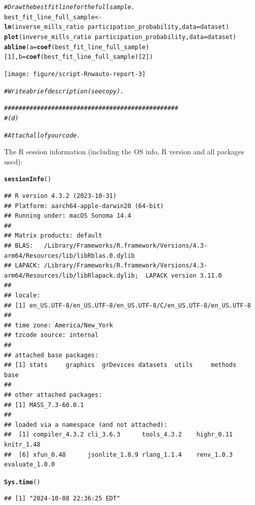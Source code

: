 \documentclass{article}\usepackage[]{graphicx}\usepackage[]{xcolor}
\makeatletter
\newcommand{\hlnum}[1]{\textcolor[rgb]{0.686,0.059,0.569}{#1}}%
\newcommand{\hlcom}[1]{\textcolor[rgb]{0.678,0.584,0.686}{\textit{#1}}}%
\newcommand{\hlopt}[1]{\textcolor[rgb]{0,0,0}{#1}}%
\newcommand{\hldef}[1]{\textcolor[rgb]{0.345,0.345,0.345}{#1}}%
\newcommand{\hlkwb}[1]{\textcolor[rgb]{0.69,0.353,0.396}{#1}}%
\newcommand{\hlkwc}[1]{\textcolor[rgb]{0.333,0.667,0.333}{#1}}%
\newcommand{\hlkwd}[1]{\textcolor[rgb]{0.737,0.353,0.396}{\textbf{#1}}}%
\newenvironment{kframe}{%
 \def\at@end@of@kframe{}%
 \ifinner\ifhmode%
  \def\at@end@of@kframe{\end{minipage}}%
  \begin{minipage}{\columnwidth}%
 \fi\fi%
 \def\FrameCommand##1{\hskip\@totalleftmargin \hskip-\fboxsep
 \colorbox{shadecolor}{##1}\hskip-\fboxsep
     \hskip-\linewidth \hskip-\@totalleftmargin \hskip\columnwidth}%
 \MakeFramed {\advance\hsize-\width
   \@totalleftmargin\z@ \linewidth\hsize
   \@setminipage}}%
 {\par\unskip\endMakeFramed%
 \at@end@of@kframe}
\newenvironment{knitrout}{}{} %
\makeatother
\begin{document}
\begin{knitrout}
{}


\begin{kframe}\begin{alltt}
\hlcom{# Draw the best fit line for the full sample.}
\hldef{best_fit_line_full_sample} \hlkwb{<-} \hlkwd{lm}\hldef{(inverse_mills_ratio}\hlopt{~}\hldef{participation_probability,} \hlkwc{data}\hldef{=dataset)}
\hlkwd{plot}\hldef{(inverse_mills_ratio}\hlopt{~}\hldef{participation_probability,} \hlkwc{data}\hldef{=dataset)}
\hlkwd{abline}\hldef{(}\hlkwc{a}\hldef{=}\hlkwd{coef}\hldef{(best_fit_line_full_sample)[}\hlnum{1}\hldef{],} \hlkwc{b}\hldef{=}\hlkwd{coef}\hldef{(best_fit_line_full_sample)[}\hlnum{2}\hldef{])}
\end{alltt}
\end{kframe}

{\centering \texttt{[image: figure/script-Rnwauto-report-3]} 

}


\begin{kframe}\begin{alltt}
\hlcom{#Write a brief description (see copy).}

\hlcom{################################################}
\hlcom{# (d)}

\hlcom{# Attach all of your code.}
\end{alltt}
\end{kframe}
\end{knitrout}

The R session information (including the OS info, R version and all
packages used):

\begin{knitrout}
\color{fgcolor}\begin{kframe}
\begin{alltt}
\hlkwd{sessionInfo}\hldef{()}
\end{alltt}
\begin{verbatim}
## R version 4.3.2 (2023-10-31)
## Platform: aarch64-apple-darwin20 (64-bit)
## Running under: macOS Sonoma 14.4
## 
## Matrix products: default
## BLAS:   /Library/Frameworks/R.framework/Versions/4.3-arm64/Resources/lib/libRblas.0.dylib 
## LAPACK: /Library/Frameworks/R.framework/Versions/4.3-arm64/Resources/lib/libRlapack.dylib;  LAPACK version 3.11.0
## 
## locale:
## [1] en_US.UTF-8/en_US.UTF-8/en_US.UTF-8/C/en_US.UTF-8/en_US.UTF-8
## 
## time zone: America/New_York
## tzcode source: internal
## 
## attached base packages:
## [1] stats     graphics  grDevices datasets  utils     methods   base     
## 
## other attached packages:
## [1] MASS_7.3-60.0.1
## 
## loaded via a namespace (and not attached):
##  [1] compiler_4.3.2 cli_3.6.3      tools_4.3.2    highr_0.11     knitr_1.48    
##  [6] xfun_0.48      jsonlite_1.8.9 rlang_1.1.4    renv_1.0.3     evaluate_1.0.0
\end{verbatim}
\begin{alltt}
\hlkwd{Sys.time}\hldef{()}
\end{alltt}
\begin{verbatim}
## [1] "2024-10-08 22:36:25 EDT"
\end{verbatim}
\end{kframe}
\end{knitrout}
\end{document}
